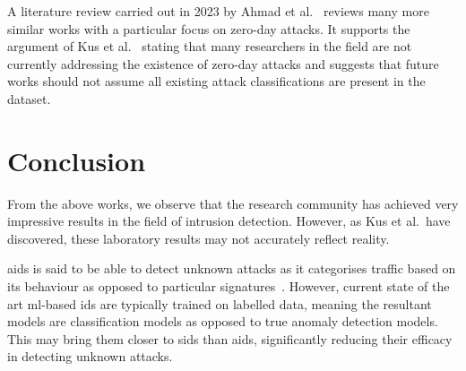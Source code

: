 A literature review carried out in 2023 by Ahmad et al.~\cite{zero-day} reviews
many more similar works with a particular focus on zero-day attacks. It
supports the argument of Kus et al.~\cite{Kus} stating that many researchers in
the field are not currently addressing the existence of zero-day attacks and
suggests that future works should not assume all existing attack
classifications are present in the dataset.

\section{Conclusion}%
\label{sec:conclusion}
From the above works, we observe that the research community has achieved
very impressive results in the field of intrusion detection. However, as Kus et
al.\ have discovered, these laboratory results may not accurately reflect
reality.

\gls{aids} is said to be able to detect unknown attacks as it categorises
traffic based on its behaviour as opposed to particular
signatures~\cite{aids-unseen}. However, current state of the art
\gls{ml}-based \gls{ids} are typically trained on labelled data, meaning the
resultant models are classification models as opposed to true anomaly detection
models. This may bring them closer to \gls{sids} than \gls{aids}, significantly
reducing their efficacy in detecting unknown attacks.
